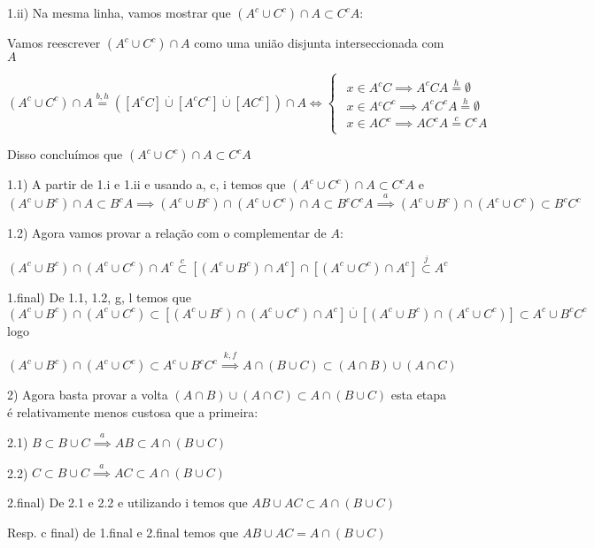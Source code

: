 \documentclass[english]{article}
\begin{document}
1.ii) Na mesma linha, vamos mostrar que $(A^{c}\cup C^{c})\cap A\subset C^{c}A$:

Vamos reescrever $(A^{c}\cup C^{c})\cap A$ como uma união disjunta
interseccionada com $A$

$(A^{c}\cup C^{c})\cap A\overset{b,h}{=}([A^{c}C]\overset{.}{\cup}[A^{c}C^{c}]\overset{.}{\cup}[AC^{c}])\cap A\Longleftrightarrow\begin{cases}
\begin{array}{c}
x\in A{}^{c}C\implies A^{c}CA\overset{h}{=}\emptyset\\
x\in A{}^{c}C^{c}\implies A^{c}C^{c}A\overset{h}{=}\emptyset\\
x\in AC^{c}\implies AC^{c}A\overset{c}{=}C^{c}A
\end{array}\end{cases}$

Disso concluímos que $(A^{c}\cup C^{c})\cap A\subset C^{c}A$

1.1) A partir de 1.i e 1.ii e usando a, c, i temos que $(A^{c}\cup C^{c})\cap A\subset C^{c}A$
e $(A^{c}\cup B^{c})\cap A\subset B^{c}A\implies(A^{c}\cup B^{c})\cap(A^{c}\cup C^{c})\cap A\subset B^{c}C^{c}A\overset{a}{\implies}(A^{c}\cup B^{c})\cap(A^{c}\cup C^{c})\subset B^{c}C^{c}$

1.2) Agora vamos provar a relação com o complementar de $A$:

$(A^{c}\cup B^{c})\cap(A^{c}\cup C^{c})\cap A^{c}\overset{c}{\subset}[(A^{c}\cup B^{c})\cap A^{c}]\cap[(A^{c}\cup C^{c})\cap A^{c}]\overset{j}{\subset}A^{c}$ 

1.final) De 1.1, 1.2, g, l temos que $(A^{c}\cup B^{c})\cap(A^{c}\cup C^{c})\subset[(A^{c}\cup B^{c})\cap(A^{c}\cup C^{c})\cap A^{c}]\overset{.}{\cup}[(A^{c}\cup B^{c})\cap(A^{c}\cup C^{c})]\subset A^{c}\cup B^{c}C^{c}$
logo

$(A^{c}\cup B^{c})\cap(A^{c}\cup C^{c})\subset A^{c}\cup B^{c}C^{c}\overset{k,f}{\implies}A\cap(B\cup C)\subset(A\cap B)\cup(A\cap C)$

2) Agora basta provar a volta $(A\cap B)\cup(A\cap C)\subset A\cap(B\cup C)$
esta etapa é relativamente menos custosa que a primeira:

2.1) $B\subset B\cup C\overset{a}{\implies}AB\subset A\cap(B\cup C)$

2.2) $C\subset B\cup C\overset{a}{\implies}AC\subset A\cap(B\cup C)$

2.final) De 2.1 e 2.2 e utilizando i temos que $AB\cup AC\subset A\cap(B\cup C)$

Resp. c final) de 1.final e 2.final temos que $AB\cup AC=A\cap(B\cup C)$
\end{document}
